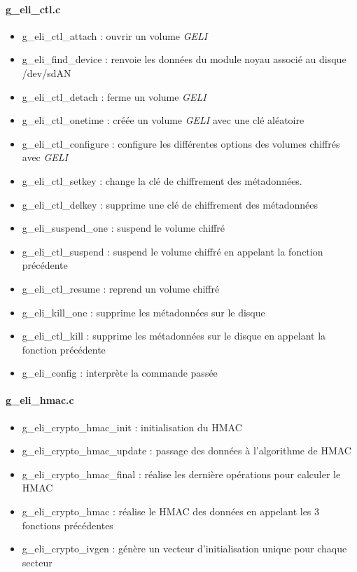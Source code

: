 \paragraph{g\_eli\_ctl.c}
\begin{itemize}
	\item g\_eli\_ctl\_attach : ouvrir un volume {\em GELI}
	\item g\_eli\_find\_device : renvoie les données du module noyau 
		associé au disque /dev/sdAN
	\item g\_eli\_ctl\_detach : ferme un volume {\em GELI}
	\item g\_eli\_ctl\_onetime : créée un volume {\em GELI} avec une clé
		aléatoire
	\item g\_eli\_ctl\_configure : configure les différentes options des
		volumes chiffrés avec {\em GELI}
	\item g\_eli\_ctl\_setkey : change la clé de chiffrement des 
		métadonnées.
	\item g\_eli\_ctl\_delkey : supprime une clé de chiffrement des 
		métadonnées
	\item g\_eli\_suspend\_one : suspend le volume chiffré
	\item g\_eli\_ctl\_suspend : suspend le volume chiffré en appelant la 
		fonction précédente
	\item g\_eli\_ctl\_resume : reprend un volume chiffré
	\item g\_eli\_kill\_one : supprime les métadonnées sur le disque
	\item g\_eli\_ctl\_kill : supprime les métadonnées sur le disque en 
		appelant la fonction précédente
	\item g\_eli\_config : interprète la commande passée
\end{itemize}
\paragraph{g\_eli\_hmac.c}
\begin{itemize}
	\item g\_eli\_crypto\_hmac\_init : initialisation du HMAC
	\item g\_eli\_crypto\_hmac\_update : passage des données à l'algorithme
		de HMAC
	\item g\_eli\_crypto\_hmac\_final : réalise les dernière opérations 
		pour calculer le HMAC
	\item g\_eli\_crypto\_hmac : réalise le HMAC des données en appelant 
		les 3 fonctions précédentes
	\item g\_eli\_crypto\_ivgen : génère un vecteur d'initialisation unique
		pour chaque secteur
\end{itemize}

